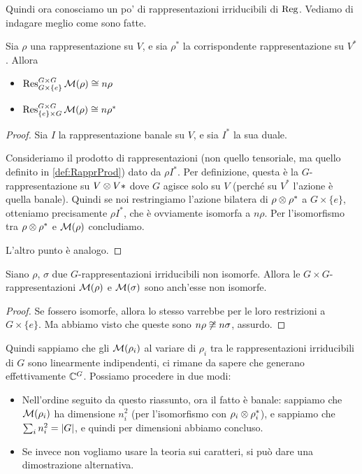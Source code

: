 	Quindi ora conosciamo un po' di rappresentazioni irriducibili di $\operatorname{Reg}$. Vediamo di indagare meglio come sono fatte.
	
	\begin{myprop}
		Sia $\rho$ una rappresentazione su $V$, e sia $\rho^*$ la corrispondente rappresentazione su $V^*$. Allora
		\begin{itemize}
		 \item $\operatorname{Res}_{G\times \{e\}}^{G\times G}\mathcal M(\rho) \cong n\rho$
		 \item $\operatorname{Res}_{\{e\}\times G}^{G\times G}\mathcal M(\rho) \cong n\rho^*$
		\end{itemize}

	 
	\end{myprop}

	\begin{proof}
		Sia $I$ la rappresentazione banale su $V$, e sia $I^*$ la sua duale. 

		Consideriamo il prodotto di rappresentazioni (non quello tensoriale, ma quello definito in \ref{def:RapprProd}) dato da $\rho I^*$. Per definizione, questa è la $G$-rappresentazione su $V\otimes V*$ dove $G$ agisce solo su $V$ (perché su $V^*$ l'azione è quella banale). Quindi se noi restringiamo l'azione bilatera di $\rho \otimes \rho^*$ a $G \times \{e\}$, otteniamo precisamente $\rho I^*$, che è ovviamente isomorfa a $n\rho$. Per l'isomorfismo tra $\rho \otimes \rho^*$ e $\mathcal M(\rho)$ concludiamo.
		
		L'altro punto è analogo.
	\end{proof}		
	
	\begin{myprop}
	 Siano $\rho$, $\sigma$ due $G$-rappresentazioni irriducibili non isomorfe. Allora le $G\times G$-rappresentazioni $\mathcal M(\rho)$ e $\mathcal M(\sigma)$ sono anch'esse non isomorfe.
	\end{myprop}
	
	\begin{proof}
	 Se fossero isomorfe, allora lo stesso varrebbe per le loro restrizioni a $G \times \{e\}$. Ma abbiamo visto che queste sono $n\rho \not\cong n\sigma$, assurdo.
	\end{proof}
	
	Quindi sappiamo che gli $\mathcal M(\rho_i)$ al variare di $\rho_i$ tra le rappresentazioni irriducibili di $G$ sono linearmente indipendenti, ci rimane da sapere che generano effettivamente $\mathbb C^{G}$. Possiamo procedere in due modi:
	
	\begin{itemize}
	 \item Nell'ordine seguito da questo riassunto, ora il fatto è banale: sappiamo che $\mathcal M(\rho_i)$ ha dimensione $n_i^2$ (per l'isomorfismo con $\rho_i \otimes \rho_i^*$), e sappiamo che $\sum_i n_i^2 = \left|G\right|$, e quindi per dimensioni abbiamo concluso.
	 \item Se invece non vogliamo usare la teoria sui caratteri, si può dare una dimostrazione alternativa.
	\end{itemize}
	
